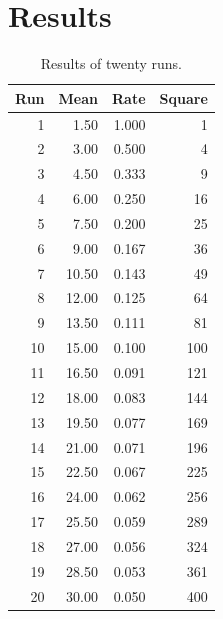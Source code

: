 \section{Results}
\lipsum[25-27]
\begin{table}[h]
\centering
\begin{tabular}{rrrr}
\toprule
Run & Mean & Rate & Square \\
\midrule
1 & 1.50 & 1.000 & 1 \\
2 & 3.00 & 0.500 & 4 \\
3 & 4.50 & 0.333 & 9 \\
4 & 6.00 & 0.250 & 16 \\
5 & 7.50 & 0.200 & 25 \\
6 & 9.00 & 0.167 & 36 \\
7 & 10.50 & 0.143 & 49 \\
8 & 12.00 & 0.125 & 64 \\
9 & 13.50 & 0.111 & 81 \\
10 & 15.00 & 0.100 & 100 \\
11 & 16.50 & 0.091 & 121 \\
12 & 18.00 & 0.083 & 144 \\
13 & 19.50 & 0.077 & 169 \\
14 & 21.00 & 0.071 & 196 \\
15 & 22.50 & 0.067 & 225 \\
16 & 24.00 & 0.062 & 256 \\
17 & 25.50 & 0.059 & 289 \\
18 & 27.00 & 0.056 & 324 \\
19 & 28.50 & 0.053 & 361 \\
20 & 30.00 & 0.050 & 400 \\
\bottomrule
\end{tabular}
\caption{Results of twenty runs.}
\end{table}
\lipsum[31-33]
